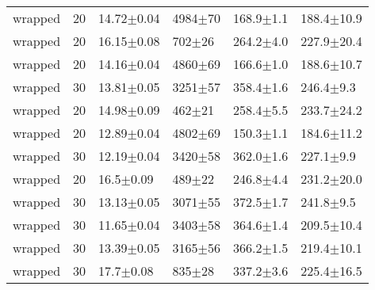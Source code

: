 \begin{tabular}{lrllll}
      wrapped &      20 &   14.72$\pm$0.04 &  4984$\pm$70 &   168.9$\pm$1.1 &  188.4$\pm$10.9 \\
      wrapped &      20 &   16.15$\pm$0.08 &   702$\pm$26 &   264.2$\pm$4.0 &  227.9$\pm$20.4 \\
      wrapped &      20 &   14.16$\pm$0.04 &  4860$\pm$69 &   166.6$\pm$1.0 &  188.6$\pm$10.7 \\
      wrapped &      30 &   13.81$\pm$0.05 &  3251$\pm$57 &   358.4$\pm$1.6 &   246.4$\pm$9.3 \\
      wrapped &      20 &   14.98$\pm$0.09 &   462$\pm$21 &   258.4$\pm$5.5 &  233.7$\pm$24.2 \\
      wrapped &      20 &   12.89$\pm$0.04 &  4802$\pm$69 &   150.3$\pm$1.1 &  184.6$\pm$11.2 \\
      wrapped &      30 &   12.19$\pm$0.04 &  3420$\pm$58 &   362.0$\pm$1.6 &   227.1$\pm$9.9 \\
      wrapped &      20 &    16.5$\pm$0.09 &   489$\pm$22 &   246.8$\pm$4.4 &  231.2$\pm$20.0 \\
      wrapped &      30 &   13.13$\pm$0.05 &  3071$\pm$55 &   372.5$\pm$1.7 &   241.8$\pm$9.5 \\
      wrapped &      30 &   11.65$\pm$0.04 &  3403$\pm$58 &   364.6$\pm$1.4 &  209.5$\pm$10.4 \\
      wrapped &      30 &   13.39$\pm$0.05 &  3165$\pm$56 &   366.2$\pm$1.5 &  219.4$\pm$10.1 \\
      wrapped &      30 &    17.7$\pm$0.08 &   835$\pm$28 &   337.2$\pm$3.6 &  225.4$\pm$16.5 \\
\hline
\end{tabular}
